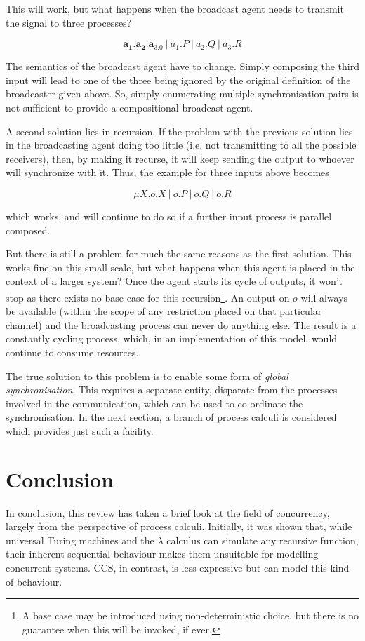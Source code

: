 This will work, but what happens when the broadcast agent needs to
transmit the signal to three processes?

\begin{equation}
\mathbf{\overline{a}_1.\overline{a}_2.\overline{a}_3.0}\ |\ a_1.P\ |\ a_2.Q\ |\ a_3.R
\end{equation}

\noindent The semantics of the broadcast agent have to change.  Simply
composing the third input will lead to one of the three being ignored
by the original definition of the broadcaster given above.  So, simply
enumerating multiple synchronisation pairs is not sufficient to
provide a compositional broadcast agent.

A second solution lies in recursion.  If the problem with the previous
solution lies in the broadcasting agent doing too little (i.e. not
transmitting to all the possible receivers), then, by making it
recurse, it will keep sending the output to whoever will synchronize
with it.  Thus, the example for three inputs above becomes

\begin{equation}
\mu X.\overline{o}.X\ |\ o.P\ |\ o.Q\ |\ o.R
\end{equation}

\noindent which works, and will continue to do so if a further
input process is parallel composed.  

But there is still a problem for much the same reasons as the first
solution.  This works fine on this small scale, but what happens when
this agent is placed in the context of a larger system?  Once the agent
starts its cycle of outputs, it won't stop as there exists
no base case for this recursion\footnote{A base case may be introduced
using non-deterministic choice, but there is no guarantee when this will
be invoked, if ever.}.  An output on $o$ will always be available (within
the scope of any restriction placed on that particular channel) and
the broadcasting process can never do anything else.  The result is a
constantly cycling process, which, in an implementation of this model,
would continue to consume resources.

The true solution to this problem is to enable some form of
\emph{global synchronisation}.  This requires a separate entity,
disparate from the processes involved in the communication, which can
be used to co-ordinate the synchronisation.  In the next section, a
branch of process calculi is considered which provides just such a facility.

\section{Conclusion}

In conclusion, this review has taken a brief look at the field of
concurrency, largely from the perspective of process calculi.
Initially, it was shown that, while universal Turing machines and the
$\lambda$ calculus can simulate any recursive function, their inherent
sequential behaviour makes them unsuitable for modelling concurrent
systems.  CCS, in contrast, is less expressive but can model this kind
of behaviour.





